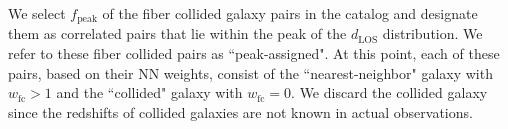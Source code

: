                                                                                                                                                                                                                                                                          We select $f_\mathrm{peak}$ of the fiber collided galaxy pairs in the catalog 
                                                                                                                                                                                                                                                                         and designate them as correlated pairs that lie within the peak of the 
                                                                                                                                                                                                                                                                         $d_\mathrm{LOS}$ distribution. We refer to these fiber collided pairs as 
                                                                                                                                                                                                                                                                         ``peak-assigned". At this point, each of these pairs, based on their NN 
                                                                                                                                                                                                                                                                         weights, consist of the ``nearest-neighbor" galaxy with $w_\mathrm{fc} > 1$ 
                                                                                                                                                                                                                                                                         and the ``collided" galaxy with $w_\mathrm{fc} = 0$. We discard the collided galaxy
                                                                                                                                                                                                                                                                         since the redshifts of collided galaxies are not known in actual observations. 

